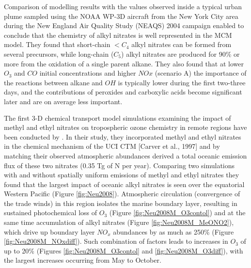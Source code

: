 \documentclass[11pt,a4paper]{article}
\begin{document}
Comparison of modelling results with the values observed inside a typical urban plume sampled using the NOAA WP-3D aircraft from the New York City area during the New England Air Quality Study (NEAQS) 2004 campaign enabled \citep{Sommariva2008} to conclude that the chemistry of alkyl nitrates is well represented in the MCM model. They found that short-chain $<C_4$ alkyl nitrates can be formed from several precursors, while long-chain ($C_5$) alkyl nitrates are produced for 90\% or more from the oxidation of a single parent alkane. They also found that at lower $O_3$ and $CO$ initial concentrations and higher $NOx$ (scenario A) the importance of the reactions between alkane and $OH$ is typically lower during the first two-three days, and the contributions of peroxides and carboxylic acids become significant later and are on average less important.

The first 3-D chemical transport  model simulations examining the impact of methyl and ethyl nitrates on tropospheric ozone chemistry in remote regions have been conducted by \cite{Neu2008}. In their study, they incorporated methyl and ethyl nitrates in the chemical mechanism of the UCI CTM [Carver et al., 1997] and by matching their observed atmospheric abundances derived a total oceanic emission flux of these two nitrates (0.35 Tg of N per year). Comparing two simulations with and without spatially uniform emissions of methyl and ethyl nitrates they found that the largest impact of oceanic alkyl nitrates is seen over the equatorial Western Pacific (Figure \ref{fig:Neu2008}). Atmospheric circulation (convergence of the trade winds) in this region isolates the marine boundary layer, resulting in sustained photochemical loss of $O_3$ (Figure \ref{fig:Neu2008M_O3contol}) and at the same time accumulation of alkyl nitrates (Figure \ref{fig:Neu2008M_MeONO2}), which drive up boundary layer $NO_x$ abundances by as much as 250\% (Figure \ref{fig:Neu2008M_NOxdiff}). Such combination of factors leads to increases in $O_3$ of up to 20\% (Figures \ref{fig:Neu2008M_O3contol} and \ref{fig:Neu2008M_O3diff}), with the largest increases occurring from May to October.
\end{document}
